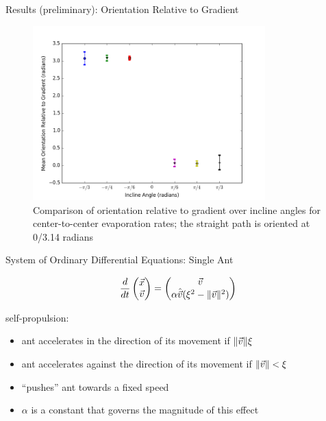\begin{frame}{Results (preliminary): Orientation Relative to Gradient}
\begin{figure}
\includegraphics[width=0.8\textwidth]{results/center-to-centermeanorientationrelativetogradient.png}
\caption{Comparison of orientation relative to gradient over incline angles for center-to-center evaporation rates; the straight path is oriented at 0/3.14 radians}
\end{figure}
\end{frame}

\begin{frame}{System of Ordinary Differential Equations: Single Ant}

    	\begin{align*}
			\frac{d}{dt} \begin{pmatrix}\vec{x}\\\vec{v}\end{pmatrix} = \begin{pmatrix}\vec{v}\\ \alpha \hat{\vec{v}}(\xi^2 - \lVert\vec{v}\rVert^2)\end{pmatrix}
		\end{align*}

\alert{self-propulsion: \cite{ryan_model_2016}}
\begin{itemize}
	\item ant accelerates in the direction of its movement if $\lVert\vec{v}\rVert  \xi$
    \item ant accelerates against the direction of its movement if $\lVert\vec{v}\rVert < \xi$
    \item``pushes'' ant towards a fixed speed
    \item $\alpha$ is a constant that governs the magnitude of this effect
\end{itemize}
\end{frame}

